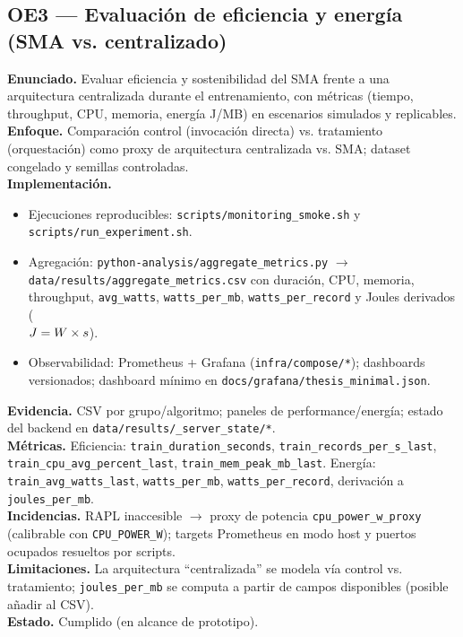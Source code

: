 \subsection*{OE3 — Evaluación de eficiencia y energía (SMA vs. centralizado)}
\textbf{Enunciado.} Evaluar eficiencia y sostenibilidad del SMA frente a una arquitectura centralizada durante el entrenamiento, con métricas (tiempo, throughput, CPU, memoria, energía J/MB) en escenarios simulados y replicables.\\
\textbf{Enfoque.} Comparación control (invocación directa) vs. tratamiento (orquestación) como proxy de arquitectura centralizada vs. SMA; dataset congelado y semillas controladas.\\
\textbf{Implementación.}
\begin{itemize}
  \item Ejecuciones reproducibles: \texttt{scripts/monitoring\_smoke.sh} y \texttt{scripts/run\_experiment.sh}.
  \item Agregación: \texttt{python-analysis/aggregate\_metrics.py} $\rightarrow$ \texttt{data/results/aggregate\_metrics.csv} con duración, CPU, memoria, throughput, \texttt{avg\_watts}, \texttt{watts\_per\_mb}, \texttt{watts\_per\_record} y Joules derivados (\\$J = W \times s\\$).
  \item Observabilidad: Prometheus + Grafana (\texttt{infra/compose/*}); dashboards versionados; dashboard mínimo en \texttt{docs/grafana/thesis\_minimal.json}.
\end{itemize}
\textbf{Evidencia.} CSV por grupo/algoritmo; paneles de performance/energía; estado del backend en \texttt{data/results/\_server\_state/*}.\\
\textbf{Métricas.} Eficiencia: \texttt{train\_duration\_seconds}, \texttt{train\_records\_per\_s\_last}, \texttt{train\_cpu\_avg\_percent\_last}, \texttt{train\_mem\_peak\_mb\_last}. Energía: \texttt{train\_avg\_watts\_last}, \texttt{watts\_per\_mb}, \texttt{watts\_per\_record}, derivación a \texttt{joules\_per\_mb}.\\
\textbf{Incidencias.} RAPL inaccesible $\rightarrow$ proxy de potencia \texttt{cpu\_power\_w\_proxy} (calibrable con \texttt{CPU\_POWER\_W}); targets Prometheus en modo host y puertos ocupados resueltos por scripts.\\
\textbf{Limitaciones.} La arquitectura “centralizada” se modela vía control vs. tratamiento; \texttt{joules\_per\_mb} se computa a partir de campos disponibles (posible añadir al CSV).\\
\textbf{Estado.} Cumplido (en alcance de prototipo).

